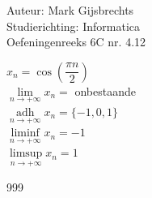 \documentclass[a4paper]{article}
\newcommand{\adh}{\underset{n\rightarrow+\infty}{\operatorname{adh}}}
\begin{document}
\noindent \large Auteur: Mark Gijsbrechts \\
\noindent \large Studierichting: Informatica\\
\noindent \large Oefeningenreeks 6C nr. 4.12\\

\medskip

\normalsize



$ x_{n} = \cos\left( \dfrac{\pi n}{2} \right) $ \\

$ \lim\limits_{n \rightarrow + \infty} x_{n} = $ onbestaande \\

$ \adh x_{n} = \{ -1, 0, 1 \} $ \\

$ \liminf\limits_{n \rightarrow + \infty} x_{n} = -1 $ \\

$ \limsup\limits_{n \rightarrow + \infty} x_{n} = 1 $ \\



\begin{thebibliography}{999}
\end{thebibliography}
\end{document}

